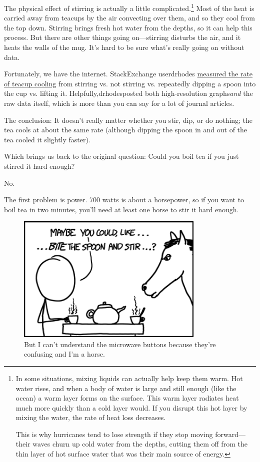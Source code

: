 {{The physical effect of stirring is actually a little complicated.{\footnote{In some situations, mixing liquids can actually help keep them warm. Hot water rises, and when a body of water is large and still enough (like the ocean) a warm layer forms on the surface. This warm layer radiates heat much more quickly than a cold layer would. If you disrupt this hot layer by mixing the water, the rate of heat loss decreases.

This is why hurricanes tend to lose strength if they stop moving forward—their waves churn up cold water from the depths, cutting them off from the thin layer of hot surface water that was their main source of energy.} } Most of the heat is carried away from teacups by the air convecting over them, and so they cool from the top down. Stirring brings fresh hot water from the depths, so it can help this process. But there are other things going on—stirring disturbs the air, and it heats the walls of the mug. It's hard to be sure what's really going on without data.}

{Fortunately, we have the internet. StackExchange userdrhodes \href{http://physics.stackexchange.com/a/5510}{measured the rate of teacup cooling} from stirring vs. not stirring vs. repeatedly dipping a spoon into the cup vs. lifting it. Helpfully,drhodesposted both high-resolution graphs\emph{and} the raw data itself, which is more than you can say for a lot of journal articles.}

{The conclusion: It doesn't really matter whether you stir, dip, or do nothing; the tea cools at about the same rate (although dipping the spoon in and out of the tea cooled it slightly faster).}

{Which brings us back to the original question: Could you boil tea if you just stirred it hard enough?}

{No.}

{The first problem is power. 700 watts is about a horsepower, so if you want to boil tea in two minutes, you'll need at least one horse to stir it hard enough.}

\begin{figure}[!htbp]
\centering
\includegraphics[scale=0.5, max width=0.8\textwidth]{imgs/a/71/tea_horse.png}
\caption{But I can't understand the microwave buttons because they're confusing and I'm a horse.}
\end{figure}

}
